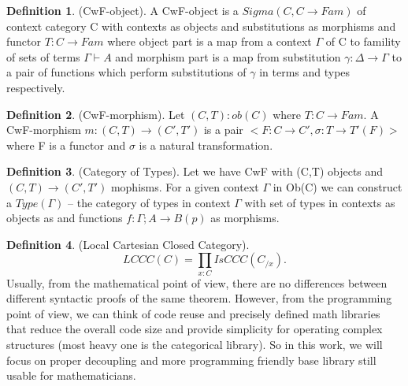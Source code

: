 \documentclass{article}
\theoremstyle{definition}
\newtheorem{definition}{Definition}
\begin{document}
\begin{definition} (CwF-object).
A CwF-object is a $Sigma(C,C\rightarrow Fam)$
of context category C with contexts as objects and
substitutions as morphisms and functor $T:C\rightarrow Fam$ where
object part is a map from a context $\Gamma$ of C to famility
of sets of terms $\Gamma\vdash A$ and morphism part is a map from
substitution $\gamma:\Delta\rightarrow\Gamma$ to a pair of functions which perform
substitutions of $\gamma$ in terms and types respectively.
\end{definition}

\begin{definition} (CwF-morphism).
Let $(C,T):ob(C)$ where $T:C\rightarrow Fam$.
A CwF-morphism $m: (C,T)\rightarrow(C',T')$ is a pair $<F:C\rightarrow C',\sigma:T\rightarrow T'(F)>$
where F is a functor and $\sigma$ is a natural transformation.
\end{definition}

\begin{definition} (Category of Types).
Let we have CwF with (C,T) objects
and $(C,T)\rightarrow(C',T')$ mophisms. For a given context $\Gamma$ in Ob(C) we can
construct a $Type(\Gamma)$ -- the category of types in context $\Gamma$ with
set of types in contexts as objects as and functions
$f:\Gamma;A\rightarrow B(p)$ as morphisms.
\end{definition}

\begin{definition} (Local Cartesian Closed Category).
$$
    LCCC(C) = \prod_{x:C}IsCCC(C_{/x}).
$$
Usually, from the mathematical point of view, there are no differences between
different syntactic proofs of the same theorem. However, from the programming point of view, we can think of code reuse and precisely defined math libraries that reduce
the overall code size and provide simplicity for operating complex
structures (most heavy one is the categorical library). So in this work, we will focus
on proper decoupling and more programming friendly base library still usable
for mathematicians.
\end{definition}



\end{document}
